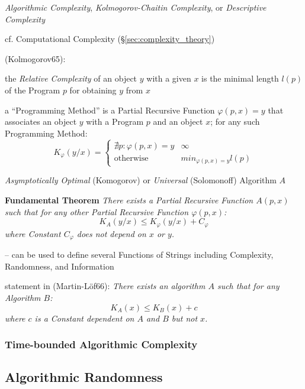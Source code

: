 \emph{Algorithmic Complexity}, \emph{Kolmogorov-Chaitin Complexity}, or
\emph{Descriptive Complexity}

cf. Computational Complexity (\S\ref{sec:complexity_theory})

(Kolmogorov65):

the \emph{Relative Complexity} of an object $y$ with a given $x$
is the minimal length $l(p)$ of the Program $p$ for obtaining $y$ from $x$

a ``Programming Method'' is a Partial Recursive Function $\varphi(p, x) = y$
that associates an object $y$ with a Program $p$ and an object $x$; for any such
Programming Method:
\[
  K_\varphi(y/x) =
  \begin{cases}
    \nexists p : \varphi(p,x) = y & \infty \\
    \text{otherwise}              & min_{\varphi(p, x)=y} l(p)
  \end{cases}
\]

\emph{Asymptotically Optimal} (Komogorov) or \emph{Universal} (Solomonoff)
Algorithm $A$

\textbf{Fundamental Theorem} \emph{
  There exists a Partial Recursive Function $A(p, x)$ such that for any other
  Partial Recursive Function $\varphi(p, x)$:
  \[
    K_A(y/x) \leq K_\varphi(y/x) + C_\varphi
  \]
  where Constant $C_\varphi$ does not depend on $x$ or $y$.
}

-- can be used to define several Functions of Strings including Complexity,
Randomness, and Information

statement in (Martin-L\"of66):
\emph{
  There exists an algorithm $A$ such that for any Algorithm $B$:
  \[
    K_A(x) \leq K_B(x) + c
  \]
  where $c$ is a Constant dependent on $A$ and $B$ but not $x$.
}



\subsubsection{Time-bounded Algorithmic Complexity}
\label{sec:time_bounded_complexity}



\subsection{Algorithmic Randomness}\label{sec:algorithmic_randomness}

